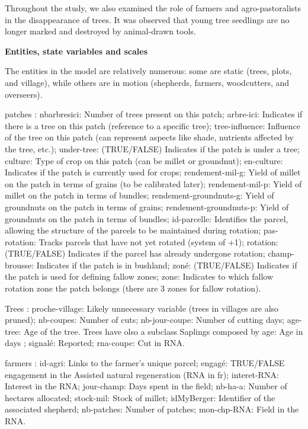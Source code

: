 \documentclass{article}
\begin{document}
        Throughout the study, we also examined the role of farmers and agro-pastoralists in the disappearance of trees. It was observed that young tree seedlings are no longer marked and destroyed by animal-drawn tools.

        \textbf{Entities, state variables and scales}

        The entities in the model are relatively numerous: some are static (trees, plots, and village), while others are in motion (shepherds, farmers, woodcutters, and overseers). 

        patches : nbarbresici: Number of trees present on this patch; arbre-ici: Indicates if there is a tree on this patch (reference to a specific tree); tree-influence: Influence of the tree on this patch (can represent aspects like shade, nutrients affected by the tree, etc.); under-tree: (TRUE/FALSE) Indicates if the patch is under a tree; culture: Type of crop on this patch (can be millet or groundnut); en-culture: Indicates if the patch is currently used for crops; rendement-mil-g: Yield of millet on the patch in terms of grains (to be calibrated later); rendement-mil-p: Yield of millet on the patch in terms of bundles; rendement-groundnuts-g: Yield of groundnuts on the patch in terms of grains; rendement-groundnuts-p: Yield of groundnuts on the patch in terms of bundles; id-parcelle: Identifies the parcel, allowing the structure of the parcels to be maintained during rotation; pas-rotation: Tracks parcels that have not yet rotated (system of +1); rotation: (TRUE/FALSE) Indicates if the parcel has already undergone rotation; champ-brousse: Indicates if the patch is in bushland; zoné: (TRUE/FALSE) Indicates if the patch is used for defining fallow zones; zone: Indicates to which fallow rotation zone the patch belongs (there are 3 zones for fallow rotation).

        Trees : proche-village: Likely unnecessary variable (trees in villages are also pruned); nb-coupes: Number of cuts; nb-jour-coupe: Number of cutting days; age-tree: Age of the tree. Trees have olso a subclass Saplings composed by age: Age in days ; signalé: Reported; rna-coupe: Cut in RNA.


        farmers : id-agri: Links to the farmer's unique parcel; engagé: TRUE/FALSE engagement in the Assisted natural regeneration (RNA in fr); interet-RNA: Interest in the RNA; jour-champ: Days spent in the field; nb-ha-a: Number of hectares allocated; stock-mil: Stock of millet; idMyBerger: Identifier of the associated shepherd; nb-patches: Number of patches; mon-chp-RNA: Field in the RNA.
\end{document}
